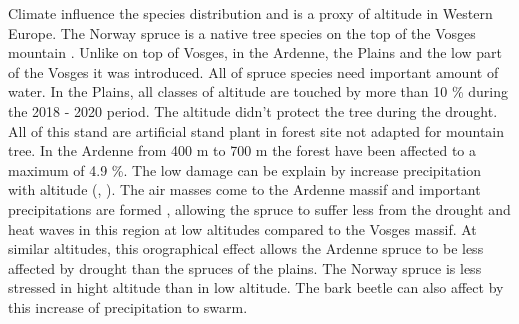 \documentclass[3p,procedia]{elsarticle}
\begin{document}
Climate influence the species distribution and is a proxy of altitude in Western Europe.
The Norway spruce is a native tree species on the top of the Vosges mountain \citep{guinier_trois_1959}. 
Unlike on top of Vosges, in the Ardenne, the Plains and the low part of the Vosges it was introduced.
All of spruce species need important amount of water. 
In the Plains, all classes of altitude are touched by more than 10 \% during the 2018 - 2020 period. 
The altitude didn't protect the tree during the drought. 
All of this stand are artificial stand plant in forest site not adapted for mountain tree. 
In the Ardenne from 400 m to 700 m the forest have been affected to a maximum of 4.9 \%. 
The low damage can be explain by increase precipitation with altitude (\cite{kotlarski_elevation_2012}, \cite{Roe_orographic_preicpitation_2005}).
The air masses come to the Ardenne massif and important precipitations are formed  \citep{van_der_perre_carte_2015}, allowing the spruce to suffer less from the drought and heat waves in this region at low altitudes compared to the Vosges massif. 
At similar altitudes, this orographical effect allows the Ardenne spruce to be less affected by drought than the spruces of the plains.
The Norway spruce is less stressed in hight altitude than in low altitude. 
The bark beetle can also affect by this increase of precipitation to swarm. 
\end{document}
